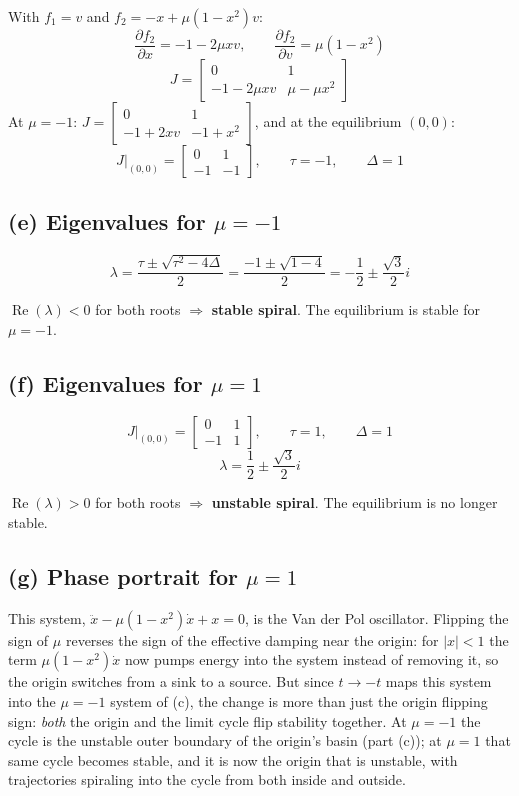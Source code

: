 \documentclass[11pt]{article}
\begin{document}
With $f_1=v$ and $f_2=-x+\mu(1-x^2)v$:
\[
\frac{\partial f_2}{\partial x}=-1-2\mu xv, \qquad \frac{\partial f_2}{\partial v}=\mu(1-x^2)
\]
\[
J=\begin{bmatrix}0&1\\-1-2\mu xv&\mu-\mu x^2\end{bmatrix}
\]
At $\mu=-1$: $J=\begin{bmatrix}0&1\\-1+2xv&-1+x^2\end{bmatrix}$, and at the equilibrium $(0,0)$:
\[
J\Big|_{(0,0)}=\begin{bmatrix}0&1\\-1&-1\end{bmatrix}, \qquad \tau=-1, \qquad \Delta=1
\]

\subsection*{(e) Eigenvalues for $\mu=-1$}

\[
\lambda=\frac{\tau\pm\sqrt{\tau^2-4\Delta}}{2}=\frac{-1\pm\sqrt{1-4}}{2}=-\frac12\pm\frac{\sqrt3}{2}i
\]

\begin{result}
$\operatorname{Re}(\lambda)<0$ for both roots $\Rightarrow$ \textbf{stable spiral}. The equilibrium is stable for $\mu=-1$.
\end{result}

\subsection*{(f) Eigenvalues for $\mu=1$}

\[
J\Big|_{(0,0)}=\begin{bmatrix}0&1\\-1&1\end{bmatrix}, \qquad \tau=1, \qquad \Delta=1
\]
\[
\lambda=\frac12\pm\frac{\sqrt3}{2}i
\]

\begin{result}
$\operatorname{Re}(\lambda)>0$ for both roots $\Rightarrow$ \textbf{unstable spiral}. The equilibrium is no longer stable.
\end{result}

\subsection*{(g) Phase portrait for $\mu=1$}

This system, $\ddot x-\mu(1-x^2)\dot x+x=0$, is the Van der Pol oscillator. Flipping the sign of $\mu$ reverses the sign of the effective damping near the origin: for $|x|<1$ the term $\mu(1-x^2)\dot x$ now pumps energy into the system instead of removing it, so the origin switches from a sink to a source. But since $t\to-t$ maps this system into the $\mu=-1$ system of (c), the change is more than just the origin flipping sign: \emph{both} the origin and the limit cycle flip stability together. At $\mu=-1$ the cycle is the unstable outer boundary of the origin's basin (part (c)); at $\mu=1$ that same cycle becomes stable, and it is now the origin that is unstable, with trajectories spiraling into the cycle from both inside and outside.
\end{document}
